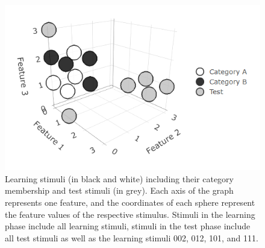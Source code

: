 \documentclass[a4paper,man,natbib]{apa6}
\begin{document}
\begin{figure}
\centering
\includegraphics[width = \textwidth]{fig_environment.png}
\caption{Learning stimuli (in black and white) including their category membership and test stimuli (in grey). Each axis of the graph represents one feature, and the coordinates of each sphere represent the feature values of the respective stimulus. Stimuli in the learning phase include all learning stimuli, stimuli in the test phase include all test stimuli as well as the learning stimuli 002, 012, 101, and 111.}
\label{fig:environment}
\end{figure}
\end{document}
